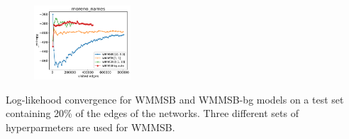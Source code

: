 \begin{subfigure}                                                           
         \centering                                                         
      \includegraphics[width=0.32\textwidth]{fig/moreno_names_fig__entropy}
\end{subfigure}                                                             
\caption{Log-likehood convergence for WMMSB and WMMSB-bg models on a test set containing 20\% of the edges of the networks. Three different sets of hyperparmeters are used for WMMSB.}

